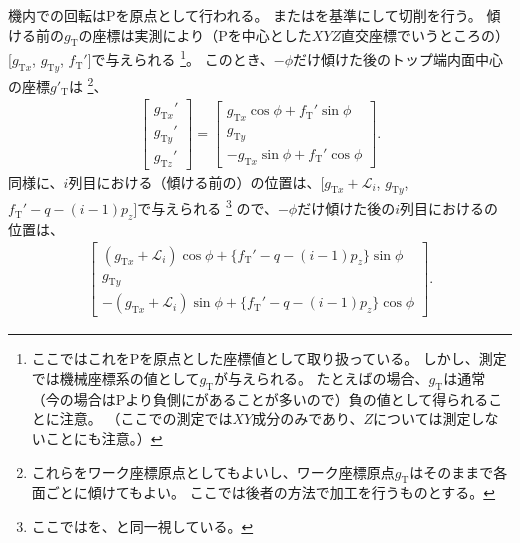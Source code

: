 \clearpage
機内での回転は\TableCenter Pを原点として行われる。
また\DimpleMilling は\TopIDCenter を基準にして切削を行う。
傾ける前の\TopIDCenter $g_\mathrm T$の座標は実測により（Pを中心とした$XYZ$直交座標でいうところの）[$g_{\mathrm Tx}$, $g_{\mathrm Ty}$, $f_\mathrm T'$]で与えられる
\footnote{ここではこれを\TableCenter Pを原点とした座標値として取り扱っている。
しかし、測定では機械座標系の値として$g_\mathrm T$が与えられる。
たとえば\Dimple の場合、$g_\mathrm T$は通常（今の場合は\TableCenter Pより負側に\CurvatureCenter があることが多いので）負の値として得られることに注意。
（ここでの測定では$XY$成分のみであり、$Z$については測定しないことにも注意。）}。
このとき、\DimpleAngle$-\phi$だけ傾けた後のトップ端内面中心の座標$g'_\mathrm T$は
\footnote{これらをワーク座標原点としてもよいし、ワーク座標原点$g_\mathrm T$はそのままで各面ごとに傾けてもよい。
ここでは後者の方法で加工を行うものとする。}、
\begin{align}
  \label{eq:afterPhiTCenterFromO}
  \left[
  \begin{array}{c}
    g_{\mathrm Tx}'\\
    g_{\mathrm Ty}'\\
    g_{\mathrm Tz}'
  \end{array}
  \right]
  =\left[
   \begin{array}{c}
     g_{\mathrm Tx}\cos\phi+f_\mathrm T'\sin\phi\\
     g_{\mathrm Ty}\\
     -g_{\mathrm Tx}\sin\phi+f_\mathrm T'\cos\phi
   \end{array}
   \right].
   \end{align}
同様に、$i$列目における（傾ける前の）\CurvatureCenter の位置は、[$g_{\mathrm Tx}+\mathcal L_i$, $g_{\mathrm Ty}$, $f_\mathrm T'-q-(i-1)p_z$]で与えられる
\footnote{ここでは\TopCurvatureCenter を、\TopIDCenter と同一視している。}
ので、\DimpleAngle$-\phi$だけ傾けた後の$i$列目における\CurvatureCenter の位置は、
\begin{align*}
  \left[
  \begin{array}{c}
    (g_{\mathrm Tx}+\mathcal L_i)\cos\phi+\{f_\mathrm T'-q-(i-1)p_z\}\sin\phi\\
    g_{\mathrm Ty}\\
    -(g_{\mathrm Tx}+\mathcal L_i)\sin\phi+\{f_\mathrm T'-q-(i-1)p_z\}\cos\phi
  \end{array}
  \right].
\end{align*}
